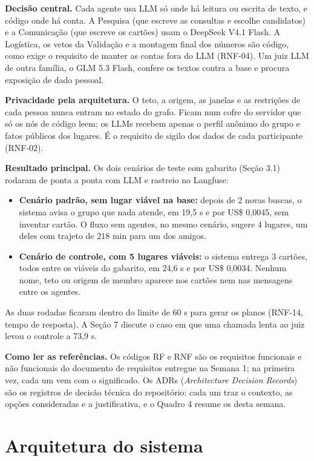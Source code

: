 \documentclass[12pt,a4paper]{article}
\begin{document}
\textbf{Decisão central.} Cada agente usa LLM só onde há leitura ou escrita de texto, e código onde há conta. A Pesquisa (que escreve as consultas e escolhe candidatos) e a Comunicação (que escreve os cartões) usam o DeepSeek V4.1 Flash. A Logística, os vetos da Validação e a montagem final dos números são código, como exige o requisito de manter as contas fora do LLM (RNF-04). Um juiz LLM de outra família, o GLM 5.3 Flash, confere os textos contra a base e procura exposição de dado pessoal.

\textbf{Privacidade pela arquitetura.} O teto, a origem, as janelas e as restrições de cada pessoa nunca entram no estado do grafo. Ficam num cofre do servidor que só os nós de código leem; os LLMs recebem apenas o perfil anônimo do grupo e fatos públicos dos lugares. É o requisito de sigilo dos dados de cada participante (RNF-02).

\textbf{Resultado principal.} Os dois cenários de teste com gabarito (Seção 3.1) rodaram de ponta a ponta com LLM e rastreio no Langfuse:

\begin{itemize}
\item \textbf{Cenário padrão, sem lugar viável na base:} depois de 2 novas buscas, o sistema avisa o grupo que nada atende, em 19,5 s e por US\$ 0,0045, sem inventar cartão. O fluxo sem agentes, no mesmo cenário, sugere 4 lugares, um deles com trajeto de 218 min para um dos amigos.
\item \textbf{Cenário de controle, com 5 lugares viáveis:} o sistema entrega 3 cartões, todos entre os viáveis do gabarito, em 24,6 s e por US\$ 0,0034. Nenhum nome, teto ou origem de membro aparece nos cartões nem nas mensagens entre os agentes.
\end{itemize}

As duas rodadas ficaram dentro do limite de 60 s para gerar os planos (RNF-14, tempo de resposta). A Seção 7 discute o caso em que uma chamada lenta ao juiz levou o controle a 73,9 s.

\textbf{Como ler as referências.} Os códigos RF e RNF são os requisitos funcionais e não funcionais do documento de requisitos entregue na Semana 1; na primeira vez, cada um vem com o significado. Os ADRs (\textit{Architecture Decision Records}) são os registros de decisão técnica do repositório: cada um traz o contexto, as opções consideradas e a justificativa, e o Quadro 4 resume os desta semana.


\section{Arquitetura do sistema}
\end{document}
